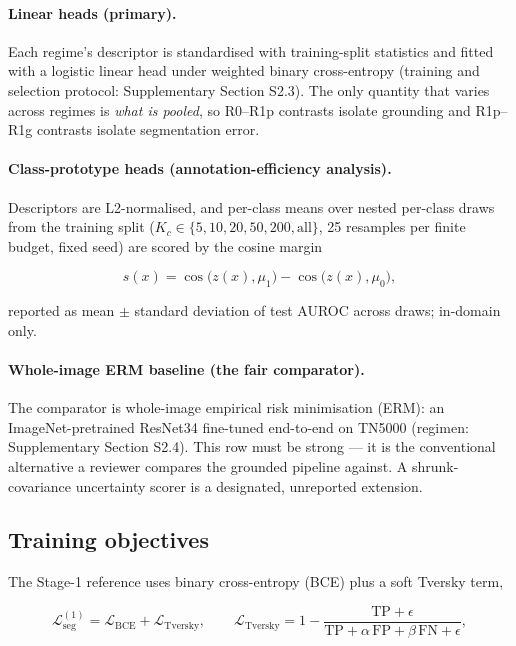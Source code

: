 \documentclass[jimh,article,submit,moreauthors,pdftex]{Definitions/tsp}
\begin{document}
\paragraph{Linear heads (primary).}
Each regime's descriptor is standardised with training-split statistics
and fitted with a logistic linear head under weighted binary
cross-entropy (training and selection protocol: Supplementary Section
S2.3). The only quantity that varies across regimes is \emph{what is
pooled}, so R0--R1p contrasts isolate grounding and R1p--R1g contrasts
isolate segmentation error.

{\sloppy
\paragraph{Class-prototype heads (annotation-efficiency analysis).}
Descriptors are L2-normalised, and per-class means over nested
per-class draws from the training split ($K_c \in
\{5,10,20,50,\allowbreak 200,\mathrm{all}\}$, 25 resamples per
finite budget, fixed seed) are scored by the cosine margin\par}

\begin{equation}
  s(x) = \cos\!\bigl(z(x),\mu_1\bigr) - \cos\!\bigl(z(x),\mu_0\bigr),
  \label{eq:cosine_margin}
\end{equation}

reported as mean $\pm$ standard deviation of test AUROC across draws;
in-domain only.

\paragraph{Whole-image ERM baseline (the fair comparator).}
The comparator is whole-image empirical risk minimisation (ERM): an
ImageNet-pretrained ResNet34 fine-tuned end-to-end on TN5000 (regimen:
Supplementary Section S2.4). This row must be strong --- it is the
conventional alternative a reviewer compares the grounded pipeline
against. A shrunk-covariance uncertainty scorer is a designated,
unreported extension.

\subsection{Training objectives}
\label{subsec:training_objectives}

The Stage-1 reference uses binary cross-entropy (BCE) plus a soft
Tversky term,

\begin{equation}
  \mathcal{L}_{\mathrm{seg}}^{(1)}
  =\mathcal{L}_{\mathrm{BCE}}+\mathcal{L}_{\mathrm{Tversky}},
  \qquad
  \mathcal{L}_{\mathrm{Tversky}}
  =1-\frac{\mathrm{TP}+\epsilon}
  {\mathrm{TP}+\alpha\,\mathrm{FP}+\beta\,\mathrm{FN}+\epsilon},
  \label{eq:stage1_loss}
\end{equation}
\end{document}
